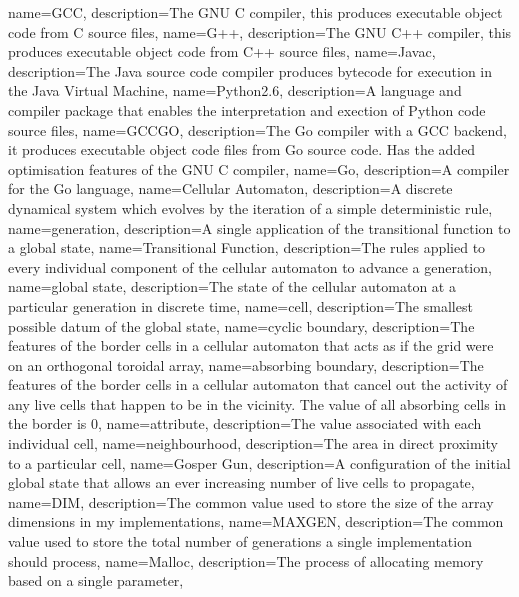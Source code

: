 {
name={GCC},
description={The GNU C compiler, this produces executable object code from C source files},
}
{
name={G++},
description={The GNU C++ compiler, this produces executable object code from C++ source files},
}
{
name={Javac},
description={The Java source code compiler produces bytecode for execution in the Java Virtual Machine},
}
{
name={Python2.6},
description={A language and compiler package that enables the interpretation and exection of Python code source files},
}
{
name={GCCGO},
description={The Go compiler with a GCC backend, it produces executable object code files from Go source code. Has the added optimisation features of the GNU C compiler},
}
{
name={Go},
description={A compiler for the Go language},
}
{
name={Cellular Automaton},
description={A discrete dynamical system which evolves by the iteration of a simple deterministic rule},
}
{
name={generation},
description={A single application of the transitional function to a global state},
}
{
name={Transitional Function},
description={The rules applied to every individual component of the cellular automaton to advance a generation},
}
{
name={global state},
description={The state of the cellular automaton at a particular generation in discrete time},
}
{
name={cell},
description={The smallest possible datum of the global state},
}
{
name={cyclic boundary},
description={The features of the border cells in a cellular automaton that acts as if the grid were on an orthogonal toroidal array},
}
{
name={absorbing boundary},
description={The features of the border cells in a cellular automaton that cancel out the activity of any live cells that happen to be in the vicinity. The value of all absorbing cells in the border is 0},
}
{
name={attribute},
description={The value associated with each individual cell},
}
{
name={neighbourhood},
description={The area in direct proximity to a particular cell},
}
{
name={Gosper Gun},
description={A configuration of the initial global state that allows an ever increasing number of live cells to propagate},
}
{
name={DIM},
description={The common value used to store the size of the array dimensions in my implementations},
}
{
name={MAXGEN},
description={The common value used to store the total number of generations a single implementation should process},
}
{
name={Malloc},
description={The process of allocating memory based on a single parameter},
}